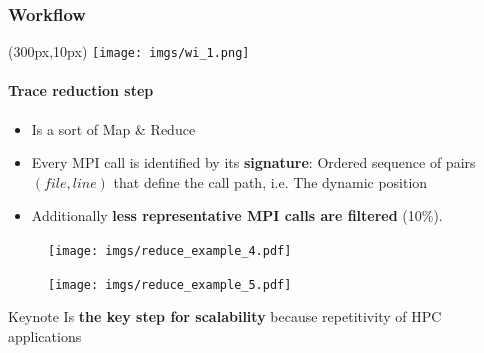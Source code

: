 \documentclass{beamer}
\begin{document}
\begin{frame}
\frametitle{Workflow}
\begin{textblock*}{5cm}(300px,10px) %
	\texttt{[image: imgs/wi\_1.png]}
\end{textblock*}
\framesubtitle{Trace reduction step}
\begin{multicols}{2}
\begin{itemize}
	\item Is a sort of Map \& Reduce
	\item Every MPI call is identified by its \textbf{signature}: Ordered sequence of pairs $(file,line)$ that define the call path, i.e. The dynamic position
	\item Additionally \textbf{less representative MPI calls are filtered} (10\%). 
\end{itemize}
\columnbreak
\begin{figure}
	\texttt{[image: imgs/reduce\_example\_4.pdf]}
\end{figure}
\begin{figure}
	\texttt{[image: imgs/reduce\_example\_5.pdf]}
\end{figure}	
\end{multicols}
\pause
\begin{block}{Keynote}
	Is \textbf{the key step for scalability} because repetitivity of HPC applications
\end{block}
\end{frame}
\end{document}
